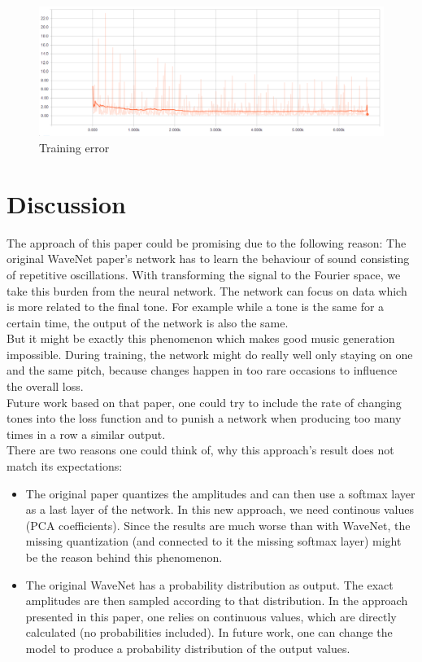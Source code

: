\documentclass[10pt,conference,compsocconf]{IEEEtran}
\begin{document}
\begin{figure}[tbp]
  \centering
  \includegraphics[width=\textwidth]{figures/loss.png}
  \caption{Training error}
  \label{fig:training_error}
\end{figure}

\section{Discussion}
The approach of this paper could be promising due to the following reason: The original WaveNet paper's network has to learn the behaviour of sound consisting of repetitive oscillations. With transforming the signal to the Fourier space, we take this burden from the neural network. The network can focus on data which is more related to the final tone. For example while a tone is the same for a certain time, the output of the network is also the same.\\
But it might be exactly this phenomenon which makes good music generation impossible. During training, the network might do really well only staying on one and the same pitch, because changes happen in too rare occasions to influence the overall loss.\\
Future work based on that paper, one could try to include the rate of changing tones into the loss function and to punish a network when producing too many times in a row a similar output.\\
There are two reasons one could think of, why this approach's result does not match its expectations:
\begin{itemize}
  \item The original paper quantizes the amplitudes and can then use a softmax layer as a last layer of the network. In this new approach, we need continous values (PCA coefficients). Since the results are much worse than with WaveNet, the missing quantization (and connected to it the missing softmax layer) might be the reason behind this phenomenon.
  \item The original WaveNet has a probability distribution as output. The exact amplitudes are then sampled according to that distribution. In the approach presented in this paper, one relies on continuous values, which are directly calculated (no probabilities included). In future work, one can change the model to produce a probability distribution of the output values.
\end{itemize}
\end{document}
